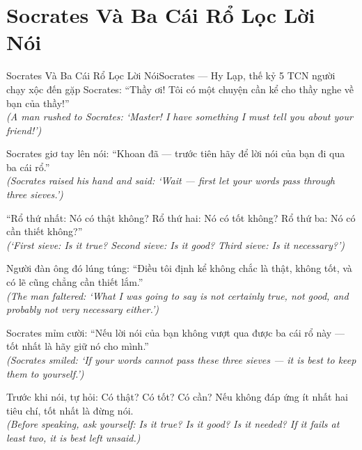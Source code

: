 \section{Socrates Và Ba Cái Rổ Lọc Lời Nói}
\begin{truyen}{Socrates Và Ba Cái Rổ Lọc Lời Nói}{Socrates --- Hy Lạp, thế kỷ 5 TCN}
 người chạy xộc đến gặp Socrates: ``Thầy ơi! Tôi có một chuyện cần kể cho thầy nghe về bạn của thầy!''\\[4pt]
\textit{(A man rushed to Socrates: `Master! I have something I must tell you about your friend!')}

Socrates giơ tay lên nói: ``Khoan đã --- trước tiên hãy để lời nói của bạn đi qua ba cái rổ.''\\[4pt]
\textit{(Socrates raised his hand and said: `Wait --- first let your words pass through three sieves.')}

``Rổ thứ nhất: Nó có thật không? Rổ thứ hai: Nó có tốt không? Rổ thứ ba: Nó có cần thiết không?''\\[4pt]
\textit{(`First sieve: Is it true? Second sieve: Is it good? Third sieve: Is it necessary?')}

Người đàn ông đó lúng túng: ``Điều tôi định kể không chắc là thật, không tốt, và có lẽ cũng chẳng cần thiết lắm.''\\[4pt]
\textit{(The man faltered: `What I was going to say is not certainly true, not good, and probably not very necessary either.')}

Socrates mỉm cười: ``Nếu lời nói của bạn không vượt qua được ba cái rổ này --- tốt nhất là hãy giữ nó cho mình.''\\[4pt]
\textit{(Socrates smiled: `If your words cannot pass these three sieves --- it is best to keep them to yourself.')}

\end{truyen}
\begin{baihoc}
  Trước khi nói, tự hỏi: Có thật? Có tốt? Có cần? Nếu không đáp ứng ít nhất hai tiêu chí, tốt nhất là đừng nói.\\[4pt]
  \textit{(Before speaking, ask yourself: Is it true? Is it good? Is it needed? If it fails at least two, it is best left unsaid.)}
\end{baihoc}


